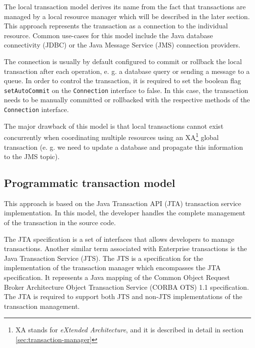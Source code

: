\documentclass[oneside,
  digital, %
  table,   %
  nolof,     %
  nolot,     %
]{fithesis3}
\begin{document}
The local transaction model derives its name from the fact that transactions are managed by a local resource manager which will be described in the later section. This approach represents the transaction as a connection to the individual resource. Common use-cases for this model include the Java database connectivity (JDBC) or the Java Message Service (JMS) connection providers.

The connection is usually by default configured to commit or rollback the local transaction after each operation, e. g. a database query or sending a message to a queue. In order to control the transaction, it is required to set the boolean flag \texttt{setAutoCommit} on the \texttt{Connection} interface to false. In this case, the transaction needs to be manually committed or rollbacked with the respective methods of the \texttt{Connection} interface.

The major drawback of this model is that local transactions cannot exist concurrently when coordinating multiple resources using an XA\footnote{XA stands for \textit{eXtended Architecture}, and it is described in detail in section \ref{sec:transaction-manager}} global transaction \cite{java_transaction_design_strategies} (e. g. we need to update a database and propagate this information to the JMS topic).

\subsection{Programmatic transaction model}

This approach is based on the Java Transaction API (JTA) transaction service implementation. In this model, the developer handles the complete management of the transaction in the source code.

The JTA specification is a set of interfaces that allows developers to manage transactions. Another similar term associated with Enterprise transactions is the Java Transaction Service (JTS). The JTS is a specification for the implementation of the transaction manager which encompasses the JTA specification. It represents a Java mapping of the Common Object Request Broker Architecture Object Transaction Service (CORBA OTS) 1.1 specification. The JTA is required to support both JTS and non-JTS implementations of the transaction management.
\end{document}
